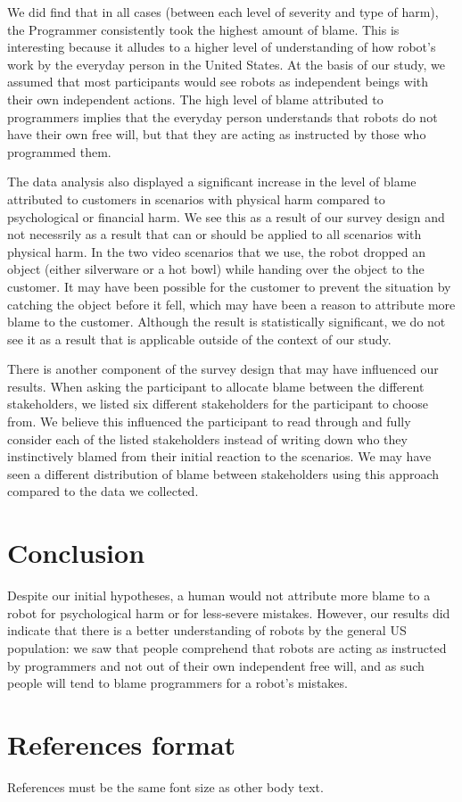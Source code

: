 \documentclass{sigchi}
\begin{document}
We did find that in all cases (between each level of severity and type of harm), the Programmer consistently took the highest amount of blame. This is interesting because it alludes to a higher level of understanding of how robot's work by the everyday person in the United States. At the basis of our study, we assumed that most participants would see robots as independent beings with their own independent actions. The high level of blame attributed to programmers implies that the everyday person understands that robots do not have their own free will, but that they are acting as instructed by those who programmed them. 

The data analysis also displayed a significant increase in the level of blame attributed to customers in scenarios with physical harm compared to psychological or financial harm. We see this as a result of our survey design and not necessrily as a result that can or should be applied to all scenarios with physical harm. In the two video scenarios that we use, the robot dropped an object (either silverware or a hot bowl) while handing over the object to the customer. It may have been possible for the customer to prevent the situation by catching the object before it fell, which may have been a reason to attribute more blame to the customer. Although the result is statistically significant, we do not see it as a result that is applicable outside of the context of our study.

There is another component of the survey design that may have influenced our results. When asking the participant to allocate blame between the different stakeholders, we listed six different stakeholders for the participant to choose from. We believe this influenced the participant to read through and fully consider each of the listed stakeholders instead of writing down who they instinctively blamed from their initial reaction to the scenarios. We may have seen a different distribution of blame between stakeholders using this approach compared to the data we collected.

\section{Conclusion}
Despite our initial hypotheses, a human would not attribute more blame to a robot for psychological harm or for less-severe mistakes. However, our results did indicate that there is a better understanding of robots by the general US population: we saw that people comprehend that robots are acting as instructed by programmers and not out of their own independent free will, and as such people will tend to blame programmers for a robot's mistakes.

\section{References format}
References must be the same font size as other body text.


\end{document}
